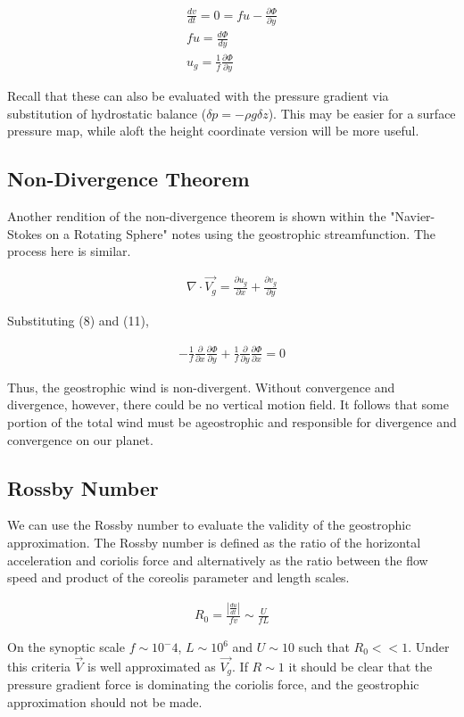 \documentclass[a4paper,12pt]{article}
\begin{document}
\begin{align}
\frac{dv}{dt} = 0 = fu - \frac{\partial\Phi}{\partial y}\\
fu = \frac{d\Phi}{dy}\\
\boxed{u_g = \frac{1}{f}\frac{\partial \Phi}{\partial y}}
\end{align}

Recall that these can also be evaluated with the pressure gradient via substitution of hydrostatic balance ($\delta p = -\rho g\delta z$). This may be easier for a surface pressure map, while aloft the height coordinate version will be more useful. 

\subsection*{Non-Divergence Theorem}
Another rendition of the non-divergence theorem is shown within the "Navier-Stokes on a Rotating Sphere" notes using the geostrophic streamfunction. The process here is similar.

\begin{align}
\nabla \cdot \vec{V_g} = \frac{\partial u_g}{\partial x} + \frac{\partial v_g}{\partial y}
\end{align}

Substituting (8) and (11),

\begin{align}
-\frac{1}{f}\frac{\partial}{\partial x}\frac{\partial \Phi}{\partial y} + \frac{1}{f}\frac{\partial}{\partial y}\frac{\partial \Phi}{\partial x} = 0
\end{align}

Thus, the geostrophic wind is non-divergent. Without convergence and divergence, however, there could be no vertical motion field. It follows that some portion of the total wind must be ageostrophic and responsible for divergence and convergence on our planet.

\subsection*{Rossby Number}
We can use the Rossby number to evaluate the validity of the geostrophic approximation. The Rossby number is defined as the ratio of the horizontal acceleration and coriolis force and alternatively as the ratio between the flow speed and product of the coreolis parameter and length scales.

\begin{align}
\boxed{R_0 = \frac{|\frac{du}{dt}|}{fv} \sim \frac{U}{fL}}
\end{align}

On the synoptic scale $f \sim 10^-4$, $L \sim 10^6$ and $U \sim 10$ such that $R_0 << 1$. Under this criteria $\vec{V}$ is well approximated as $\vec{V_g}$. If $R \sim 1$ it should be clear that the pressure gradient force is dominating the coriolis force, and the geostrophic approximation should not be made.
\end{document}
